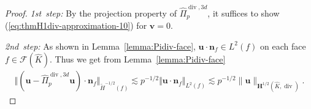 \documentclass{article}
\newcommand{\hatPidivcom}{\widehat\Pi^{\operatorname*{div},3d}_{p}}
\begin{document}
\begin{proof}
\emph{1st~step:} By the projection property of $\hatPidivcom$, it suffices to show 
(\ref{eq:thmH1div-approximation-10}) for ${\mathbf v} = 0$. 

\emph{2nd~step:} As shown in Lemma~\ref{lemma:Pidiv-face}, $\mathbf{u}\cdot \mathbf{n}_f \in L^2(f)$ on each face $f\in \mathcal{F}(\widehat{K})$. Thus we get 
from Lemma~\ref{lemma:Pidiv-face}
\begin{align}
\label{eq:thm:H1div-approximation-12}
\Vert({\mathbf{u}}-\hatPidivcom{\mathbf{u}})\cdot{\mathbf{n}}_{f}\Vert_{\widetilde{H}^{-1/2}(f)}\lesssim p^{-1/2}\Vert{\mathbf{u}}\cdot{\mathbf{n}}_{f}\Vert_{L^2(f)} 
\lesssim p^{-1/2} \|{\mathbf u}\|_{{\mathbf H}^{1/2}(\widehat K,\operatorname{div})}. 
\end{align}


\end{proof}
\end{document}
